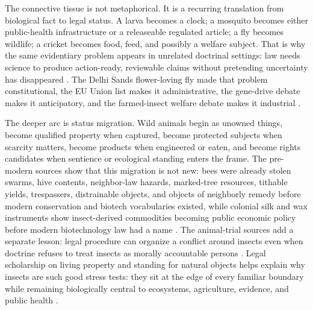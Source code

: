 \documentclass[
  english,
]{article}
\begin{document}
The connective tissue is not metaphorical. It is a recurring translation
from biological fact to legal status. A larva becomes a clock; a
mosquito becomes either public-health infrastructure or a releaseable
regulated article; a fly becomes wildlife; a cricket becomes food, feed,
and possibly a welfare subject. That is why the same evidentiary problem
appears in unrelated doctrinal settings: law needs science to produce
action-ready, reviewable claims without pretending uncertainty has
disappeared \citep{jasanoff2015serviceable}. The Delhi Sands
flower-loving fly made that problem constitutional, the EU Union list
makes it administrative, the gene-drive debate makes it anticipatory,
and the farmed-insect welfare debate makes it industrial
\citep{nagle1998delhi, ec_ias2026, oye2014gene_drives, barrett2023farmed_insect_welfare}.

The deeper arc is status migration. Wild animals begin as unowned
things, become qualified property when captured, become protected
subjects when scarcity matters, become products when engineered or
eaten, and become rights candidates when sentience or ecological
standing enters the frame. The pre-modern sources show that this
migration is not new: bees were already stolen swarms, hive contents,
neighbor-law hazards, marked-tree resources, tithable yields,
trespassers, distrainable objects, and objects of neighborly remedy
before modern conservation and biotech vocabularies existed, while
colonial silk and wax instruments show insect-derived commodities
becoming public economic policy before modern biotechnology law had a
name
\citep{hittite_laws_bees, mishnah_bava_batra5_3_beehive, mishnah_bava_batra2_10_bees, lex_salica_bees, edictum_rothari_bees, ruskaia_pravda_bees, sobornoe_ulozhenie1649_bees, bechbretha_bee_judgments, selden1618_tithes_bees, elderfield1650_tythes_bees, virginia_assembly1619_mulberry, carolina_charter1663_silks_wax}.
The animal-trial sources add a separate lesson: legal procedure can
organize a conflict around insects even when doctrine refuses to treat
insects as morally accountable persons
\citep{chasseneuz1581_consilia, bailly1668_monitoires_insectes, menabrea1846_animal_judgments, evans1884_bugs_beasts}.
Legal scholarship on living property and standing for natural objects
helps explain why insects are such good stress tests: they sit at the
edge of every familiar boundary while remaining biologically central to
ecosystems, agriculture, evidence, and public health
\citep{favre2010living_property, stone1972trees, cardoso2020scientists_warning, fao2013edible_insects}.
\end{document}
